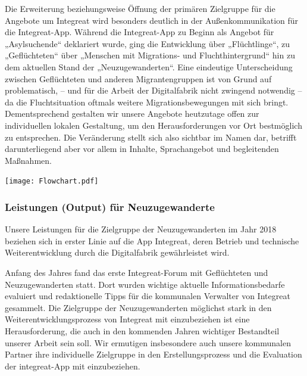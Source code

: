 \documentclass[12pt, a4paper]{article} %
\begin{document}
Die Erweiterung beziehungsweise Öffnung der primären Zielgruppe für die
Angebote um Integreat wird besonders deutlich in der Außenkommunikation
für die Integreat-App. Während die Integreat-App zu Beginn als Angebot
für „Asylsuchende“ deklariert wurde, ging die Entwicklung über
„Flüchtlinge“, zu „Geflüchteten“ über „Menschen mit Migrations- und
Fluchthintergrund“ hin zu dem aktuellen Stand der „Neuzugewanderten“.
Eine eindeutige Unterscheidung zwischen Geflüchteten und anderen
Migrantengruppen ist von Grund auf problematisch, – und für die Arbeit
der Digitalfabrik nicht zwingend notwendig – da die Fluchtsituation
oftmals weitere Migrationsbewegungen mit sich bringt. Dementsprechend
gestalten wir unsere Angebote heutzutage offen zur individuellen lokalen
Gestaltung, um den Herausforderungen vor Ort bestmöglich zu entsprechen.
Die Veränderung stellt sich also sichtbar im Namen dar, betrifft
darunterliegend aber vor allem in Inhalte, Sprachangebot und begleitenden Maßnahmen.

\vspace{0.5cm}

\begin{minipage}[t]{\textwidth}
    \texttt{[image: Flowchart.pdf]}
\end{minipage}

\hypertarget{leistungen-output-fuxfcr-neuzugewanderte}{%
\subsubsection{Leistungen (Output) für
Neuzugewanderte}\label{leistungen-output-fuxfcr-neuzugewanderte}}

Unsere Leistungen für die Zielgruppe der Neuzugewanderten im Jahr 2018
beziehen sich in erster Linie auf die App Integreat, deren Betrieb und
technische Weiterentwicklung durch die Digitalfabrik gewährleistet wird.

Anfang des Jahres fand das erste Integreat-Forum mit Geflüchteten und
Neuzugewanderten statt. Dort wurden wichtige aktuelle
Informationsbedarfe evaluiert und redaktionelle Tipps für die kommunalen
Verwalter von Integreat gesammelt. Die Zielgruppe der Neuzugewanderten
möglichst stark in den Weiterentwicklungsprozess von Integreat mit
einzubeziehen ist eine Herausforderung, die auch in den kommenden Jahren
wichtiger Bestandteil unserer Arbeit sein soll. Wir ermutigen
insbesondere auch unsere kommunalen Partner ihre individuelle Zielgruppe
in den Erstellungsprozess und die Evaluation der integreat-App mit
einzubeziehen.
\end{document}
